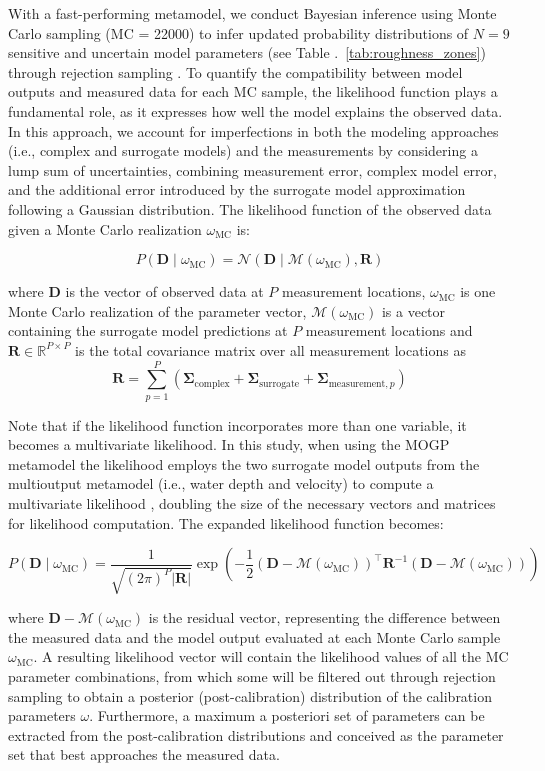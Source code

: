 \documentclass[draft,linenumbers,onecolumn]{agujournal2019} %
\begin{document}
With a fast-performing metamodel, we conduct Bayesian inference using Monte Carlo sampling (MC = 22000) to infer updated probability distributions of \(N = 9\) sensitive and uncertain model parameters (see Table .~\ref{tab:roughness_zones}) through rejection sampling \cite{beckers2020bayesian}. To quantify the compatibility between model outputs and measured data for each MC sample, the likelihood function plays a fundamental role, as it expresses how well the model explains the observed data. In this approach, we account for imperfections in both the modeling approaches (i.e., complex and surrogate models) and the measurements by considering a lump sum of uncertainties, combining measurement error, complex model error, and the additional error introduced by the surrogate model approximation following a Gaussian distribution. The likelihood function of the observed data given a Monte Carlo realization \( \omega_{\text{MC}} \) is:

\[
P(\bm{D} \mid \omega_{\text{MC}}) = \mathcal{N}(\bm{D} \mid \mathcal{M}(\omega_{\text{MC}}), \bm{R})
\]

where \( \bm{D} \) is the vector of observed data at \(P\) measurement locations, \( \omega_{\text{MC}} \) is one Monte Carlo realization of the parameter vector, \( \mathcal{M}(\omega_{\text{MC}}) \) is a vector containing the surrogate model predictions at \(P\) measurement locations and \( \bm{R} \in \mathbb{R}^{P \times P} \) is the total covariance matrix over all measurement locations as 
\[
\mathbf{R} = \sum_{p=1}^{P} \left( \mathbf{\Sigma}_{\text{complex}} + \mathbf{\Sigma}_{\text{surrogate}} + \mathbf{\Sigma}_{\text{measurement},p} \right)
\]

Note that if the likelihood function incorporates more than one variable, it becomes a multivariate likelihood. In this study, when using the MOGP metamodel the likelihood employs the two surrogate model outputs from the multioutput metamodel (i.e., water depth and velocity) to compute a multivariate likelihood , doubling the size of the necessary vectors and matrices for likelihood computation. The expanded likelihood function becomes: 

\[
P(\bm{D} \mid \omega_{\text{MC}}) = \frac{1}{\sqrt{(2\pi)^P |\bm{R}|}} \exp\left( -\frac{1}{2} \left( \bm{D} - \mathcal{M}(\omega_{\text{MC}}) \right)^\top \bm{R}^{-1} \left( \bm{D} - \mathcal{M}(\omega_{\text{MC}}) \right) \right)
\]

where \( \bm{D} - \mathcal{M}(\omega_{\text{MC}}) \) is the residual vector, representing the difference between the measured data and the model output evaluated at each Monte Carlo sample \( \omega_{\text{MC}} \). A resulting likelihood vector will contain the likelihood values of all the MC parameter combinations, from which some will be filtered out through rejection sampling \cite{smith1992bayesian} to obtain a posterior (post-calibration) distribution of the calibration parameters \(\omega\). Furthermore, a maximum a posteriori set of parameters can be extracted from the post-calibration distributions and conceived as the parameter set that best approaches the measured data.
\end{document}
